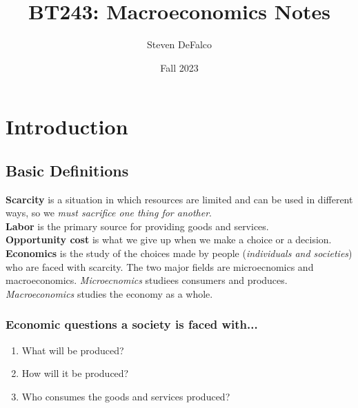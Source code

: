 \documentclass{article}
\title{BT243: Macroeconomics Notes}
\author{Steven DeFalco}
\date{Fall 2023}
\begin{document}
\maketitle
\tableofcontents
\newpage



\section{Introduction}

\subsection{Basic Definitions}

\textbf{Scarcity} is a situation in which resources are limited and can be used in different ways, so we \emph{must sacrifice one thing for another}. \\ 

\textbf{Labor} is the primary source for providing goods and services. \\

\textbf{Opportunity cost} is what we give up when we make a choice or a decision. \\

\textbf{Economics} is the study of the choices made by people (\emph{individuals and societies}) who are faced with scarcity. The two major fields are microecnomics and macroeconomics. \emph{Microecnomics} studiees consumers and produces. \emph{Macroeconomics} studies the economy as a whole. \\ 

\subsubsection{Economic questions a society is faced with...}

\begin{enumerate}
  \item What will be produced? 
  \item How will it be produced?
  \item Who consumes the goods and services produced?
\end{enumerate}
\end{document}
